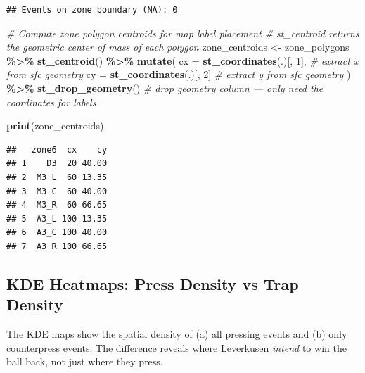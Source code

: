 \documentclass[
]{article}
\newenvironment{Shaded}{\begin{snugshade}}{\end{snugshade}}
\newcommand{\AttributeTok}[1]{\textcolor[rgb]{0.13,0.29,0.53}{#1}}
\newcommand{\CommentTok}[1]{\textcolor[rgb]{0.56,0.35,0.01}{\textit{#1}}}
\newcommand{\DecValTok}[1]{\textcolor[rgb]{0.00,0.00,0.81}{#1}}
\newcommand{\FunctionTok}[1]{\textcolor[rgb]{0.13,0.29,0.53}{\textbf{#1}}}
\newcommand{\NormalTok}[1]{#1}
\newcommand{\OtherTok}[1]{\textcolor[rgb]{0.56,0.35,0.01}{#1}}
\newcommand{\SpecialCharTok}[1]{\textcolor[rgb]{0.81,0.36,0.00}{\textbf{#1}}}
\newcommand{\StringTok}[1]{\textcolor[rgb]{0.31,0.60,0.02}{#1}}
\begin{document}
\begin{Shaded}
\end{Shaded}

\begin{verbatim}
## Events on zone boundary (NA): 0
\end{verbatim}

\begin{Shaded}
\begin{Highlighting}[]
\CommentTok{\# Compute zone polygon centroids for map label placement}
\CommentTok{\# st\_centroid returns the geometric center of mass of each polygon}
\NormalTok{zone\_centroids }\OtherTok{\textless{}{-}}\NormalTok{ zone\_polygons }\SpecialCharTok{\%\textgreater{}\%}
  \FunctionTok{st\_centroid}\NormalTok{() }\SpecialCharTok{\%\textgreater{}\%}
  \FunctionTok{mutate}\NormalTok{(}
    \AttributeTok{cx =} \FunctionTok{st\_coordinates}\NormalTok{(.)[, }\DecValTok{1}\NormalTok{],   }\CommentTok{\# extract x from sfc geometry}
    \AttributeTok{cy =} \FunctionTok{st\_coordinates}\NormalTok{(.)[, }\DecValTok{2}\NormalTok{]    }\CommentTok{\# extract y from sfc geometry}
\NormalTok{  ) }\SpecialCharTok{\%\textgreater{}\%}
  \FunctionTok{st\_drop\_geometry}\NormalTok{()  }\CommentTok{\# drop geometry column — only need the coordinates for labels}

\FunctionTok{print}\NormalTok{(zone\_centroids)}
\end{Highlighting}
\end{Shaded}

\begin{verbatim}
##   zone6  cx    cy
## 1    D3  20 40.00
## 2  M3_L  60 13.35
## 3  M3_C  60 40.00
## 4  M3_R  60 66.65
## 5  A3_L 100 13.35
## 6  A3_C 100 40.00
## 7  A3_R 100 66.65
\end{verbatim}

\subsection{KDE Heatmaps: Press Density vs Trap
Density}\label{kde-heatmaps-press-density-vs-trap-density}

The KDE maps show the spatial density of (a) all pressing events and (b)
only counterpress events. The difference reveals where Leverkusen
\emph{intend} to win the ball back, not just where they press.
\end{document}
